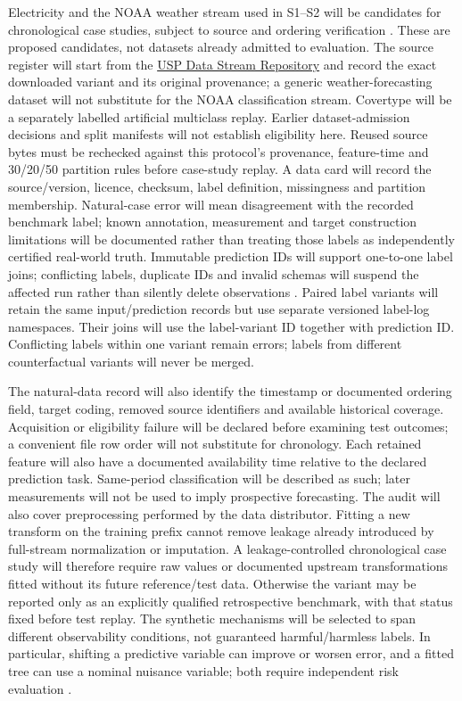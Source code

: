 \documentclass[11pt,a4paper]{article}
\begin{document}
Electricity and the NOAA weather stream used in S1--S2 will be candidates for
chronological case studies, subject to source and ordering verification
\cite{cerqueira,window}. These are proposed candidates, not datasets already
admitted to evaluation. The source register will start from the
\href{https://sites.google.com/view/uspdsrepository}{USP Data Stream Repository}
and record the exact downloaded variant and its original provenance; a generic
weather-forecasting dataset will not substitute for the NOAA classification
stream. Covertype will be a separately labelled artificial multiclass replay.
Earlier dataset-admission decisions and split manifests will not establish
eligibility here. Reused source bytes must be rechecked against this protocol's
provenance, feature-time and 30/20/50 partition rules before case-study replay.
A data card will record the source/version, licence, checksum, label definition,
missingness and partition membership. Natural-case error will mean disagreement
with the recorded benchmark label; known annotation, measurement and target
construction limitations will be documented rather than treating those labels
as independently certified real-world truth. Immutable prediction IDs will support
one-to-one label joins; conflicting labels, duplicate IDs and invalid schemas
will suspend the affected run rather than silently delete observations
\cite{souza,awsjoin}.
Paired label variants will retain the same input/prediction records but use
separate versioned label-log namespaces. Their joins will use the label-variant
ID together with prediction ID. Conflicting labels within one variant remain
errors; labels from different counterfactual variants will never be merged.

The natural-data record will also identify the timestamp or documented ordering
field, target coding, removed source identifiers and available historical
coverage. Acquisition or eligibility failure will be declared before examining
test outcomes; a convenient file row order will not substitute for chronology.
Each retained feature will also have a documented availability time relative
to the declared prediction task. Same-period classification will be described
as such; later measurements will not be used to imply prospective forecasting.
The audit will also cover preprocessing performed by the data distributor.
Fitting a new transform on the training prefix cannot remove leakage already
introduced by full-stream normalization or imputation. A leakage-controlled
chronological case study will therefore require raw values or documented
upstream transformations fitted without its future reference/test data.
Otherwise the variant may be reported only as an explicitly qualified
retrospective benchmark, with that status fixed before test replay.
The synthetic mechanisms will be selected to span different observability
conditions, not guaranteed harmful/harmless labels. In particular, shifting a
predictive variable can improve or worsen error, and a fitted tree can use a
nominal nuisance variable; both require independent risk evaluation
\cite{souza,window}.
\end{document}
